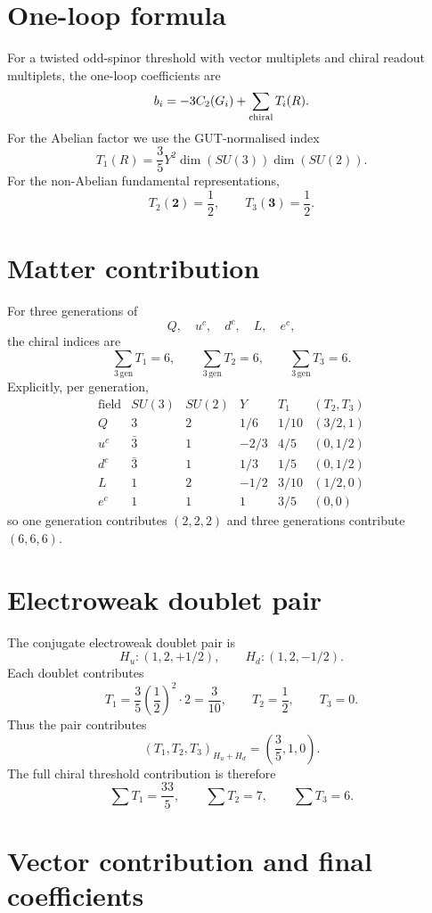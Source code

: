 \documentclass[12pt,a4paper]{article}
\begin{document}
\section{One-loop formula}

For a twisted odd-spinor threshold with vector multiplets and chiral readout
multiplets, the one-loop coefficients are
\[
  b_i=-3C_2(G_i)+\sum_{\rm chiral}T_i(R).
\]
For the Abelian factor we use the GUT-normalised index
\[
  T_1(R)=\frac35Y^2\dim(SU(3))\dim(SU(2)).
\]
For the non-Abelian fundamental representations,
\[
  T_2(\mathbf 2)=\frac12,
  \qquad
  T_3(\mathbf 3)=\frac12.
\]

\section{Matter contribution}

For three generations of
\[
  Q,\quad u^c,\quad d^c,\quad L,\quad e^c,
\]
the chiral indices are
\[
  \sum_{3\,\mathrm{gen}} T_1=6,
  \qquad
  \sum_{3\,\mathrm{gen}} T_2=6,
  \qquad
  \sum_{3\,\mathrm{gen}} T_3=6.
\]
Explicitly, per generation,
\[
\begin{array}{c|c|c|c|c|c}
\text{field} & SU(3) & SU(2) & Y & T_1 & (T_2,T_3)\\
\hline
Q & 3 & 2 & 1/6 & 1/10 & (3/2,1)\\
u^c & \bar 3 & 1 & -2/3 & 4/5 & (0,1/2)\\
d^c & \bar 3 & 1 & 1/3 & 1/5 & (0,1/2)\\
L & 1 & 2 & -1/2 & 3/10 & (1/2,0)\\
e^c & 1 & 1 & 1 & 3/5 & (0,0)
\end{array}
\]
so one generation contributes $(2,2,2)$ and three generations contribute
$(6,6,6)$.

\section{Electroweak doublet pair}

The conjugate electroweak doublet pair is
\[
  H_u:(1,2,+1/2),
  \qquad
  H_d:(1,2,-1/2).
\]
Each doublet contributes
\[
  T_1=\frac35\left(\frac12\right)^2\cdot2=\frac{3}{10},
  \qquad
  T_2=\frac12,
  \qquad
  T_3=0.
\]
Thus the pair contributes
\[
  (T_1,T_2,T_3)_{H_u+H_d}=\left(\frac35,1,0\right).
\]
The full chiral threshold contribution is therefore
\[
  \sum T_1=\frac{33}{5},
  \qquad
  \sum T_2=7,
  \qquad
  \sum T_3=6.
\]

\section{Vector contribution and final coefficients}
\end{document}
